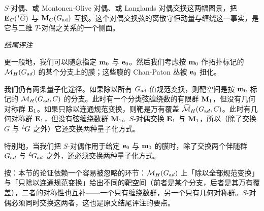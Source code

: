 $S$-对偶、或 Montonen-Olive 对偶、或 Langlands 对偶交换这两幅图景，把 ${\bf E}_C({}^L\negthinspace\bar G)$ 与 ${\bf M}_C(G_{\rm{ad}})$ 互换。这个对偶交换弦的离散守恒动量与缠绕这一事实，是它与二维 $T$-对偶之关系的一个侧面。

\par\medskip\emph{结尾评注}

更一般地，我们可以随意指定 ${\bf m}_0$ 与 ${\bf e}_0$。然后我们考虑按 ${\bf m}_0$ 作拓扑标记的 $\MHAD$ 的某个分支上的膜；这些膜的 Chan-Paton 丛被 ${\bf e}_0$ 扭化。

我们仍有两条量子化途径。如果除以所有 $G_{\rm {ad}}$-值规范变换，则靶空间是按 ${\bf m}_0$ 标记的 $\MH(G_{\rm ad},C)$ 的分支。此时有一个分类弦缠绕数的有限群 ${\bf M}_1$，但没有几何对称群 ${\bf E}_1$。如果只除以连通规范变换，则靶是万有覆盖 $\hat\M_H(G_{\rm ad},C)$。此时有几何对称群 ${\bf E}_1$，但没有弦缠绕数群 ${\bf M}_1$。$S$-对偶交换 ${\bf E}_1$ 与 ${\bf M}_1$，所以（除了交换 $G$ 与 $^L\negthinspace G$ 之外）它还交换两种量子化方式。

特别地，当我们把 $S$-对偶作用于给定 ${\bf e}_0$ 与 ${\bf m}_0$ 的膜时，除了交换两个伴随群 $G_{\rm ad}$ 与 $^L\negthinspace G_{\rm ad}$ 之外，还必须交换两种量子化方式。

\begin{yizhu}[含糊点拨]
按：本节的论证依赖一个容易被忽略的环节：$\MHAD$ 上「除以全部规范变换」与「只除以连通规范变换」给出不同的靶空间（前者是某个分支，后者是其万有覆盖），二者的对称性也互补——一个只有缠绕数群，另一个只有几何对称群。$S$-对偶必须同时交换这两者，这也是原文结尾评注的要点。
\end{yizhu}
